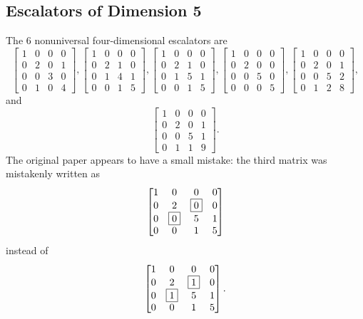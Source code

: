 \documentclass[letterpaper, 12pt]{article}
\begin{document}
\subsection{Escalators of Dimension 5}\label{section:5 dim escalators}
The $6$ nonuniversal four-dimensional escalators are
\[\begin{bmatrix} 1 & 0 & 0 & 0 \\ 0 & 2 & 0 & 1 \\ 0 & 0 & 3 & 0 \\ 0 & 1 & 0 & 4 \end{bmatrix}, \begin{bmatrix} 1 & 0 & 0 & 0 \\ 0 & 2 & 1 & 0 \\ 0 & 1 & 4 & 1 \\ 0 & 0 & 1 & 5 \end{bmatrix}, \begin{bmatrix} 1 & 0 & 0 & 0 \\ 0 & 2 & 1 & 0 \\ 0 & 1 & 5 & 1 \\ 0 & 0 & 1 & 5 \end{bmatrix}, \begin{bmatrix} 1 & 0 & 0 & 0 \\ 0 & 2 & 0 & 0 \\ 0 & 0 & 5 & 0 \\ 0 & 0 & 0 & 5 \end{bmatrix}, \begin{bmatrix} 1 & 0 & 0 & 0 \\ 0 & 2 & 0 & 1 \\ 0 & 0 & 5 & 2 \\ 0 & 1 & 2 & 8 \end{bmatrix},\]
and
\[\begin{bmatrix} 1 & 0 & 0 & 0 \\ 0 & 2 & 0 & 1 \\ 0 & 0 & 5 & 1 \\ 0 & 1 & 1 & 9 \end{bmatrix}.\]
The original paper appears to have a small mistake: the third matrix was mistakenly written as
\[\begin{bmatrix} 1&0&0&0 \\ 0&2&\fbox0&0 \\ 0&\fbox0&5&1 \\ 0&0&1&5\end{bmatrix}\]
instead of
\[\begin{bmatrix} 1&0&0&0 \\ 0&2&\fbox1&0 \\ 0&\fbox1&5&1 \\ 0&0&1&5\end{bmatrix}.\]
\end{document}
